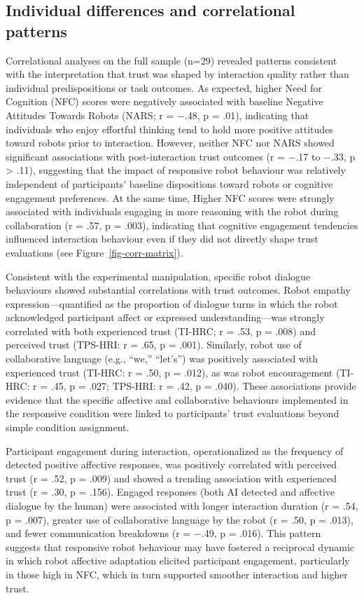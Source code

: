\documentclass[
  letterpaper,
  DIV=11,
  numbers=noendperiod]{scrartcl}
\begin{document}
\subsection{Individual differences and correlational
patterns}\label{individual-differences-and-correlational-patterns}

Correlational analyses on the full sample (n=29) revealed patterns
consistent with the interpretation that trust was shaped by interaction
quality rather than individual predispositions or task outcomes. As
expected, higher Need for Cognition (NFC) scores were negatively
associated with baseline Negative Attitudes Towards Robots (NARS; r =
−.48, p = .01), indicating that individuals who enjoy effortful thinking
tend to hold more positive attitudes toward robots prior to interaction.
However, neither NFC nor NARS showed significant associations with
post-interaction trust outcomes (r = −.17 to −.33, p \textgreater{}
.11), suggesting that the impact of responsive robot behaviour was
relatively independent of participants' baseline dispositions toward
robots or cognitive engagement preferences. At the same time, Higher NFC
scores were strongly associated with individuals engaging in more
reasoning with the robot during collaboration (r = .57, p = .003),
indicating that cognitive engagement tendencies influenced interaction
behaviour even if they did not directly shape trust evaluations (see
Figure~\ref{fig-corr-matrix}).

Consistent with the experimental manipulation, specific robot dialogue
behaviours showed substantial correlations with trust outcomes. Robot
empathy expression---quantified as the proportion of dialogue turns in
which the robot acknowledged participant affect or expressed
understanding---was strongly correlated with both experienced trust
(TI-HRC; r = .53, p = .008) and perceived trust (TPS-HRI: r = .65, p =
.001). Similarly, robot use of collaborative language (e.g., ``we,''
``let's'') was positively associated with experienced trust (TI-HRC: r =
.50, p = .012), as was robot encouragement (TI-HRC: r = .45, p = .027;
TPS-HRI: r = .42, p = .040). These associations provide evidence that
the specific affective and collaborative behaviours implemented in the
responsive condition were linked to participants' trust evaluations
beyond simple condition assignment.

Participant engagement during interaction, operationalized as the
frequency of detected positive affective responses, was positively
correlated with perceived trust (r = .52, p = .009) and showed a
trending association with experienced trust (r = .30, p = .156). Engaged
responses (both AI detected and affective dialogue by the human) were
associated with longer interaction duration (r = .54, p = .007), greater
use of collaborative language by the robot (r = .50, p = .013), and
fewer communication breakdowns (r = −.49, p = .016). This pattern
suggests that responsive robot behaviour may have fostered a reciprocal
dynamic in which robot affective adaptation elicited participant
engagement, particularly in those high in NFC, which in turn supported
smoother interaction and higher trust.
\end{document}
